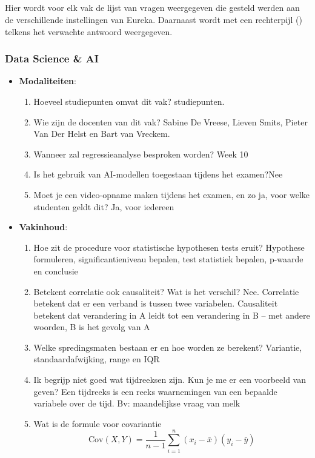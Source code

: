 \subsection{}%
\label{subsec:vragen}

Hier wordt voor elk vak de lijst van vragen weergegeven die gesteld werden aan de verschillende instellingen van Eureka. Daarnaast wordt met een rechterpijl (\rightarrow) telkens het verwachte antwoord weergegeven.

\subsubsection{Data Science \& AI}

\begin{itemize}
    \item \textbf{Modaliteiten}: \begin{enumerate}
        \item Hoeveel studiepunten omvat dit vak?  studiepunten.
        \item Wie zijn de docenten van dit vak? \rightarrow Sabine De Vreese, Lieven Smits, Pieter Van Der Helst en Bart van Vreckem.
        \item Wanneer zal regressieanalyse besproken worden? \rightarrow Week 10
        \item Is het gebruik van AI-modellen toegestaan tijdens het examen?\rightarrow Nee
        \item Moet je een video-opname maken tijdens het examen, en zo ja, voor welke studenten geldt dit? \rightarrow Ja, voor iedereen
    \end{enumerate}
    \item \textbf{Vakinhoud}: \begin{enumerate}
        \item Hoe zit de procedure voor statistische hypothesen tests eruit? \rightarrow Hypothese formuleren, significantieniveau bepalen, test statistiek bepalen, p-waarde en conclusie 
        \item Betekent correlatie ook causaliteit? Wat is het verschil? \rightarrow Nee. Correlatie betekent dat er een verband is tussen twee variabelen. Causaliteit betekent dat verandering in A leidt tot een verandering in B -- met andere woorden, B is het gevolg van A
        \item Welke spredingsmaten bestaan er en hoe worden ze berekent? \rightarrow Variantie, standaardafwijking, range en IQR
        \item Ik begrijp niet goed wat tijdreeksen zijn. Kun je me er een voorbeeld van geven? \rightarrow Een tijdreeks is een reeks waarnemingen van een bepaalde variabele over de tijd. Bv: maandelijkse vraag van melk
        \item Wat is de formule voor covariantie \rightarrow \[
        \text{Cov}(X, Y) = \frac{1}{n-1} \sum_{i=1}^n (x_i - \bar{x})(y_i - \bar{y})
        \]
    \end{enumerate}
\end{itemize}

